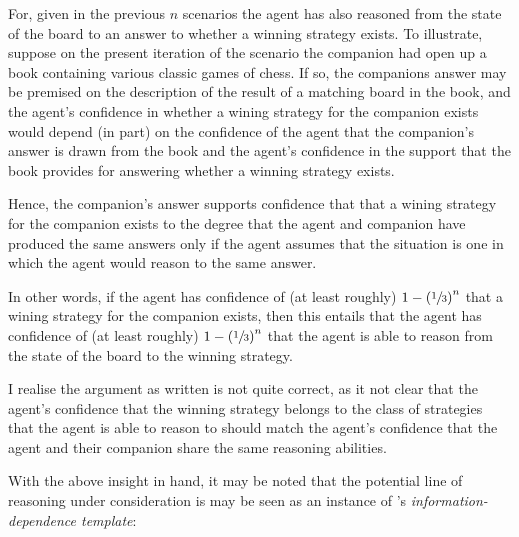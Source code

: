 \documentclass[10pt]{article}
\begin{document}
For, given in the previous \(n\) scenarios the agent has also reasoned from the state of the board to an answer to whether a winning strategy exists.
To illustrate, suppose on the present iteration of the scenario the companion had open up a book containing various classic games of chess.
If so, the companions answer may be premised on the description of the result of a matching board in the book, and the agent's confidence in whether a wining strategy for the companion exists would depend (in part) on the confidence of the agent that the companion's answer is drawn from the book and the agent's confidence in the support that the book provides for answering whether a winning strategy exists.

Hence, the companion's answer supports confidence that that a wining strategy for the companion exists to the degree that the agent and companion have produced the same answers only if the agent assumes that the situation is one in which the agent would reason to the same answer.

In other words, if the agent has confidence of (at least roughly) \(1 - \left(\sfrac{1}{3}\right)^{n}\) that a wining strategy for the companion exists, then this entails that the agent has confidence of (at least roughly) \(1 - \left(\sfrac{1}{3}\right)^{n}\) that the agent is able to reason from the state of the board to the winning strategy.

\begin{note}
  I realise the argument as written is not quite correct, as it not clear that the agent's confidence that the winning strategy belongs to the class of strategies that the agent is able to reason to should match the agent's confidence that the agent and their companion share the same reasoning abilities.
\end{note}

With the above insight in hand, it may be noted that the potential line of reasoning under consideration is may be seen as an instance of \citeauthor{Wright:2003aa}'s \emph{information-dependence template}:
\end{document}
